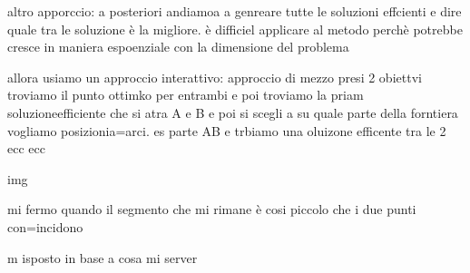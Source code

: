 altro apporccio: a posteriori
andiamoa a genreare tutte le soluzioni effcienti e dire quale tra le soluzione è la migliore. è difficiel applicare al metodo perchè potrebbe cresce in maniera espoenziale con la dimensione del problema



allora usiamo un approccio interattivo:
approccio di mezzo
presi 2 obiettvi troviamo il punto ottimko per entrambi e poi troviamo la priam soluzioneefficiente che si atra A e B e poi si scegli a su quale parte della forntiera vogliamo posizionia=arci. es parte AB e trbiamo una oluizone efficente tra le 2 ecc ecc
 
img

mi fermo quando il segmento che mi rimane è cosi piccolo che i due punti con=incidono

m isposto in base a cosa mi server